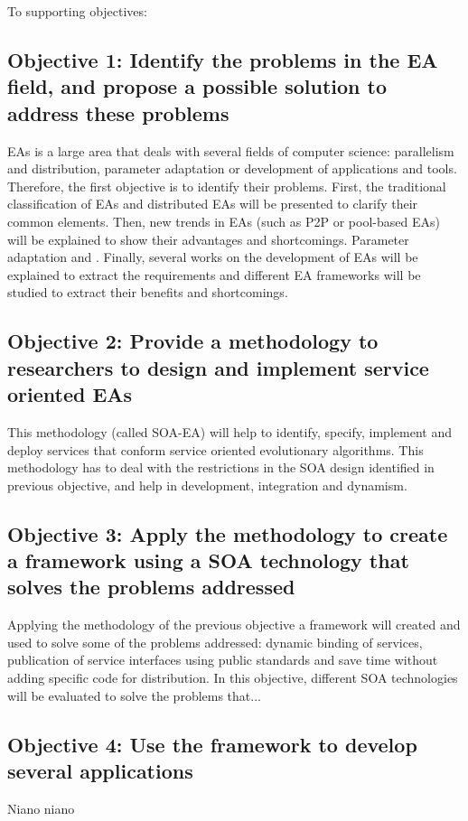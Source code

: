 To supporting objectives:

\subsection{Objective 1: Identify the problems in the EA field, and propose a possible solution to address these problems}
\label{subsec:intro:obj:problems}
EAs is a large area that deals with several fields of computer science: parallelism and distribution, parameter adaptation or development of applications and tools. Therefore, the first objective is to identify their problems. First, the traditional classification of EAs and distributed EAs will be presented to clarify their common elements. Then, new trends in EAs (such as P2P or pool-based EAs) will be explained to show their advantages and shortcomings. Parameter adaptation and . Finally, several works on the development of EAs will be explained to extract the requirements and different EA frameworks will be studied to extract their benefits and shortcomings.

\subsection{Objective 2: Provide a methodology to researchers to design and implement service oriented EAs} 
\label{subsec:intro:obj:methodology}
This methodology (called SOA-EA) will help to identify, specify, implement and deploy services that conform service oriented evolutionary algorithms. This methodology has to deal with the restrictions in the SOA design identified in previous objective, and help in development, integration and dynamism.

\subsection{Objective 3: Apply the methodology to create a framework using a SOA technology that solves the problems addressed}
\label{subsec:intro:obj:fwork}
Applying the methodology of the previous objective a framework will created and used to solve some of the problems addressed: dynamic binding of services, publication of service interfaces using public standards and save time without adding specific code for distribution. In this objective, different SOA technologies will be evaluated to solve the problems that...

\subsection{Objective 4: Use the framework to develop several applications }
\label{subsec:intro:obj:applications}
Niano niano



